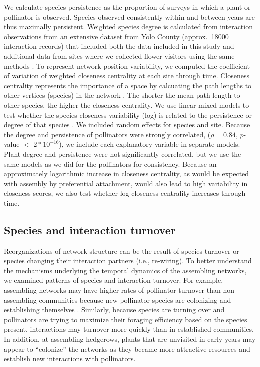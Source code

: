 \documentclass[12pt]{article}
\begin{document}
We calculate species persistence as the proportion of surveys in which
a plant or pollinator is observed. Species observed consistently
within and between years are thus maximally persistent. Weighted
species degree is calculated from interaction observations from an
extensive dataset from Yolo County (approx.~18000 interaction records)
that included both the data included in this study and additional data
from sites where we collected flower visitors using the same methods
\citep{mgonigle-2015-x, ponisio2015farm}. To represent network
position variability, we computed the coefficient of variation of
weighted closeness centrality \citep{freeman1978centrality} at each
site through time. Closeness centrality represents the importance of a
space by calcuating the path lengths to other vertices (species) in
the network \citep{freeman1978centrality}. The shorter the mean path
length to other species, the higher the closeness centrality. We use
linear mixed models to test whether the species closeness variability
(log) is related to the persistence or degree of that species
\citep{lme4, lmetest}. We included random effects for species and
site. Because the degree and persistence of pollinators were strongly
correlated, ($\rho = 0.84$, $p$-value $<$ $2*10^{-16}$), we include
each explanatory variable in separate models. Plant degree and
persistence were not significantly correlated, but we use the same
models as we did for the pollinators for consistency.  Because an
approximately logarithmic increase in closeness centrality, as would
be expected with assembly by preferential attachment, would also lead
to high variability in closeness scores, we also test whether log
closeness centrality increases through time.

\subsection*{Species and interaction turnover}

Reorganizations of network structure can be the result of species
turnover or species changing their interaction partners (i.e.,
re-wiring). To better understand the mechanisms underlying the
temporal dynamics of the assembling networks, we examined patterns of
species and interaction turnover. For example, assembling networks may
have higher rates of pollinator turnover than non-assembling
communities because new pollinator species are colonizing and
establishing themselves \citep{mgonigle-2015-x}. Similarly, because
species are turning over and pollinators are trying to maximize their
foraging efficiency based on the species present, interactions may
turnover more quickly than in established communities. In addition, at
assembling hedgerows, plants that are unvisited in early years may
appear to ``colonize'' the networks as they became more attractive
resources and establish new interactions with pollinators.
\end{document}
